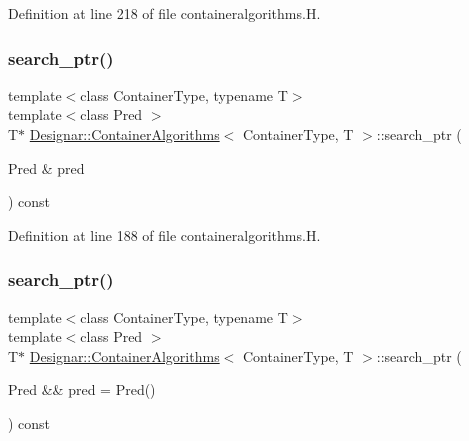 Definition at line 218 of file containeralgorithms.\+H.

\mbox{\label{class_designar_1_1_container_algorithms_aa68717192cead08642f941dd4d9f06a1}} 
\subsubsection{\texorpdfstring{search\+\_\+ptr()}{search\_ptr()}\hspace{0.1cm}{\footnotesize\ttfamily [1/2]}}
{\footnotesize\ttfamily template$<$class Container\+Type, typename T$>$ \\
template$<$class Pred $>$ \\
T$\ast$ \hyperlink{class_designar_1_1_container_algorithms}{Designar\+::\+Container\+Algorithms}$<$ Container\+Type, T $>$\+::search\+\_\+ptr (\begin{DoxyParamCaption}\item[{Pred \&}]{pred }\end{DoxyParamCaption}) const\hspace{0.3cm}{\ttfamily [inline]}}



Definition at line 188 of file containeralgorithms.\+H.

\mbox{\label{class_designar_1_1_container_algorithms_a4d399ce473d6cddf3e133044403f492d}} 
\subsubsection{\texorpdfstring{search\+\_\+ptr()}{search\_ptr()}\hspace{0.1cm}{\footnotesize\ttfamily [2/2]}}
{\footnotesize\ttfamily template$<$class Container\+Type, typename T$>$ \\
template$<$class Pred $>$ \\
T$\ast$ \hyperlink{class_designar_1_1_container_algorithms}{Designar\+::\+Container\+Algorithms}$<$ Container\+Type, T $>$\+::search\+\_\+ptr (\begin{DoxyParamCaption}\item[{Pred \&\&}]{pred = {\ttfamily Pred()} }\end{DoxyParamCaption}) const\hspace{0.3cm}{\ttfamily [inline]}}



